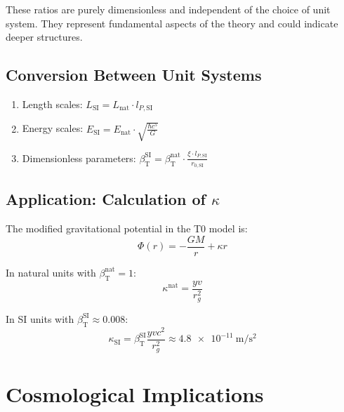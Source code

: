 ﻿\documentclass[12pt,a4paper]{article}
\newcommand{\betaT}{\beta_{\text{T}}}
\begin{document}
	These ratios are purely dimensionless and independent of the choice of unit system. They represent fundamental aspects of the theory and could indicate deeper structures.
	
	\subsection{Conversion Between Unit Systems}
	
	\begin{tcolorbox}[colback=blue!5!white, colframe=blue!75!black, title=Conversion Scheme]
		\begin{enumerate}
			\item Length scales: \(L_{\text{SI}} = L_{\text{nat}} \cdot l_{P,\text{SI}}\)
			\item Energy scales: \(E_{\text{SI}} = E_{\text{nat}} \cdot \sqrt{\frac{\hbar c^5}{G}}\)
			\item Dimensionless parameters: \(\betaT^{\text{SI}} = \betaT^{\text{nat}} \cdot \frac{\xi \cdot l_{P,\text{SI}}}{r_{0,\text{SI}}}\)
		\end{enumerate}
	\end{tcolorbox}
	
	\subsection{Application: Calculation of \(\kappa\)}
	
	The modified gravitational potential in the T0 model is:
	\begin{equation}
		\Phi(r) = -\frac{G M}{r} + \kappa r
	\end{equation}
	
	
	
	In natural units with \(\betaT^{\text{nat}} = 1\):
	\begin{equation}
		\kappa^{\text{nat}} = \frac{y v}{r_g^2}
	\end{equation}
	
	In SI units with \(\betaT^{\text{SI}} \approx 0.008\):
	\begin{equation}
		\kappa_{\text{SI}} = \betaT^{\text{SI}} \frac{y v c^2}{r_g^2} \approx \SI{4.8e-11}{\meter\per\second\squared}
	\end{equation}
	
	\section{Cosmological Implications}
	
\end{document}
